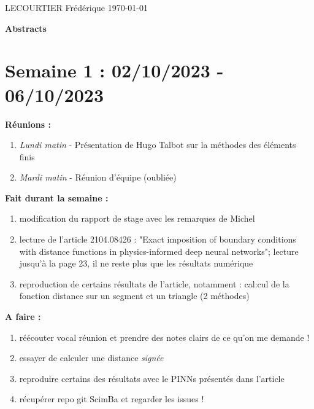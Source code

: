 \documentclass[french]{article}
\begin{document}
	LECOURTIER Frédérique \hfill \today
	\begin{center}
		\Large\textbf{{Abstracts}}
	\end{center}

\section{Semaine 1 : 02/10/2023 - 06/10/2023}
	\textbf{Réunions :}
	\begin{enumerate}[label=\textbullet]
		\item \textit{Lundi matin} -  Présentation de Hugo Talbot sur la méthodes des éléments finis
		\item \textit{Mardi matin} - Réunion d'équipe (oubliée)
	\end{enumerate}
	\textbf{Fait durant la semaine :}
	\begin{enumerate}[label=\textbullet]
		\item modification du rapport de stage avec les remarques de Michel
		\item lecture de l'article 2104.08426 : "Exact imposition of boundary conditions with distance functions in physics-informed deep neural networks"; lecture jusqu'à la page 23, il ne reste plus que les résultats numérique
		\item reproduction de certains résultats de l'article, notamment : cal:cul de la fonction distance sur un segment et un triangle (2 méthodes)
	\end{enumerate}

	\textbf{A faire :}
	\begin{enumerate}[label=\textbullet]
		\item réécouter vocal réunion et prendre des notes clairs de ce qu'on me demande !
		\item essayer de calculer une distance \textit{signée}
		\item reproduire certains des résultats avec le PINNs présentés dans l'article
		\item récupérer repo git ScimBa et regarder les issues !
	\end{enumerate}
\end{document}
